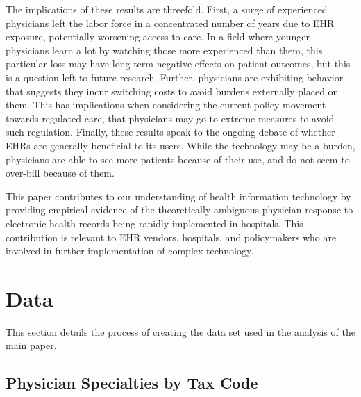 \documentclass[12pt]{article}
\begin{document}
The implications of these results are threefold. First, a surge of experienced physicians left the labor force in a concentrated number of years due to EHR exposure, potentially worsening access to care. In a field where younger physicians learn a lot by watching those more experienced than them, this particular loss may have long term negative effects on patient outcomes, but this is a question left to future research. Further, physicians are exhibiting behavior that suggests they incur switching costs to avoid burdens externally placed on them. This has implications when considering the current policy movement towards regulated care, that physicians may go to extreme measures to avoid such regulation. Finally, these results speak to the ongoing debate of whether EHRs are generally beneficial to its users. While the technology may be a burden, physicians are able to see more patients because of their use, and do not seem to over-bill because of them. 

This paper contributes to our understanding of health information technology by providing empirical evidence of the theoretically ambiguous physician response to electronic health records being rapidly implemented in hospitals. This contribution is relevant to EHR vendors, hospitals, and policymakers who are involved in further implementation of complex technology. 




\clearpage

\renewcommand*{\bibfont}{\footnotesize}

\printbibliography

\clearpage


\appendix

\section{Data}\label{app:data}

This section details the process of creating the data set used in the analysis of the main paper. 

\subsection{Physician Specialties by Tax Code}\label{sec:taxcode}
\end{document}
